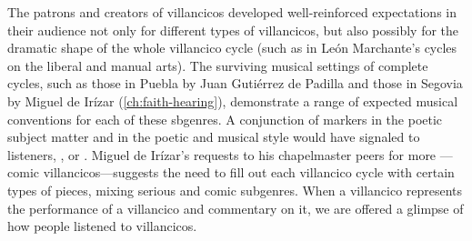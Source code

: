 The patrons and creators of villancicos developed well-reinforced expectations
in their audience not only for different types of villancicos, but also
possibly for the dramatic shape of the whole villancico cycle (such as in León
Marchante's cycles on the liberal and manual arts).
The surviving musical settings of complete cycles, such as those in Puebla by
Juan Gutiérrez de Padilla and those in Segovia by Miguel de Irízar
(\cref{ch:faith-hearing}), demonstrate a range of expected musical conventions
for each of these sbgenres.
A conjunction of markers in the poetic subject matter and in the poetic and
musical style would have signaled to listeners, , or .
Miguel de Irízar's requests to his chapelmaster peers for more
---comic villancicos---suggests the need to fill
out each villancico cycle with certain types of pieces, mixing serious and
comic subgenres.%
    \Autocite[78]{Olarte:Irizar} 
When a villancico represents the performance of a villancico and commentary on
it, we are offered a glimpse of how people listened to villancicos.

